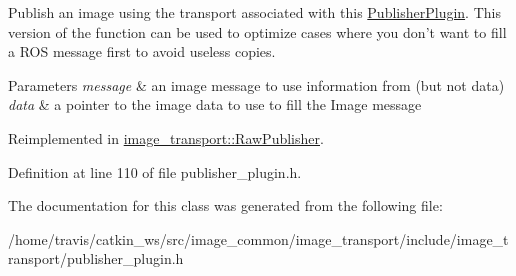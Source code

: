 Publish an image using the transport associated with this \hyperlink{classimage__transport_1_1_publisher_plugin}{Publisher\-Plugin}. This version of the function can be used to optimize cases where you don't want to fill a R\-O\-S message first to avoid useless copies. 


\begin{DoxyParams}{Parameters}
{\em message} & an image message to use information from (but not data) \\
\hline
{\em data} & a pointer to the image data to use to fill the Image message \\
\hline
\end{DoxyParams}


Reimplemented in \hyperlink{classimage__transport_1_1_raw_publisher_a62ee9d7dab3a361ad92c70a4df5d6416}{image\-\_\-transport\-::\-Raw\-Publisher}.



Definition at line 110 of file publisher\-\_\-plugin.\-h.



The documentation for this class was generated from the following file\-:\begin{DoxyCompactItemize}
\item 
/home/travis/catkin\-\_\-ws/src/image\-\_\-common/image\-\_\-transport/include/image\-\_\-transport/publisher\-\_\-plugin.\-h\end{DoxyCompactItemize}
